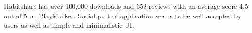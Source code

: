 Habitshare has over 100,000 downloads and 658 reviews with an average score 4.5 out of 5 on PlayMarket.
Social part of application seems to be well accepted by users as well as simple and minimalistic UI\@.

%
%
%
%
%
%
%
%

